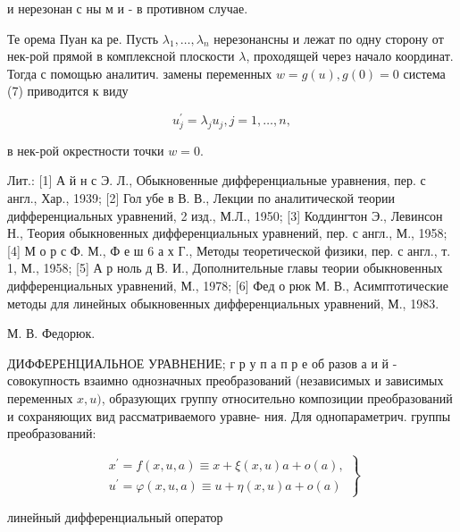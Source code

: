 \documentclass[10pt]{article}
\begin{document}
и нерезонан с ны м и - в противном случае.



Те орема Пуан ка ре. Пусть $\lambda_{1}, \ldots, \lambda_{n}$ нерезонансны и лежат по одну сторону от нек-рой прямой в комплексной плоскости $\lambda$, проходящей через начало координат. Тогда с помощью аналитич. замены переменных $w=g(u), g(0)=0$ система (7) приводится к виду



\[

u_{j}^{\prime}=\lambda_{j} u_{j}, j=1, \ldots, n,

\]



в нек-рой окрестности точки $w=0$.



Лит.: [1] А й н с Э. Л., Обыкновенные дифференциальные уравнения, пер. с англ., Хар., 1939; [2] Гол убе в В. В., Лекции по аналитической теории дифференциальных уравнений, 2 изд., М.Л., 1950; [3] Коддингтон Э., Левинсон Н., Теория обыкновенных дифференциальных уравнений, пер. с англ., М., 1958; [4] М о р с Ф. М., Ф е ш 6 а х Г., Методы теоретической физики, пер. с англ., т. 1, М., 1958; [5] А р ноль д В. И., Дополнительные главы теории обыкновенных дифференциальных уравнений, М., 1978; [6] Фед о рюк М. В., Асимптотические методы для линейных обыкновенных дифференциальных уравнений, М., 1983.



М. В. Федорюк.



ДИФФЕРЕНЦИАЛЬНОЕ УРАВНЕНИЕ; г р у п а п р е об разов а и й - совокупность взаимно однозначных преобразований (независимых и зависимых переменных $x, u)$, образующих группу относительно композиции преобразований и сохраняющих вид рассматриваемого уравне- ния. Для однопараметрич. группы преобразований:



\[

\left.\begin{array}{l}

x^{\prime}=f(x, u, a) \equiv x+\xi(x, u) a+o(a), \\

u^{\prime}=\varphi(x, u, a) \equiv u+\eta(x, u) a+o(a)

\end{array}\right\}

\]



линейный дифференциальный оператор
\end{document}
